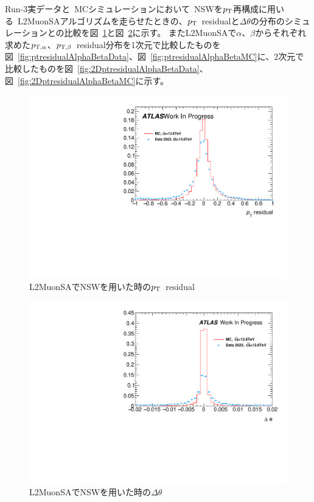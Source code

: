 Run-3実データと~MCシミュレーションにおいて~NSWを$p_\mathrm{T}$再構成に用いる~L2MuonSAアルゴリズムを走らせたときの、$p_\mathrm{T}$~residualと$\Delta\theta$の分布のシミュレーションとの比較を図~\ref{fig:ptresidualDataMC}と図~\ref{fig:deltaThetaDataMC}に示す。
またL2MuonSAで$\alpha$、$\beta$からそれぞれ求めた$p_{\rm{T, \alpha}}$、$p_{\rm{T, \beta}}$~residual分布を1次元で比較したものを図~\ref{fig:ptresidualAlphaBetaData}、図~\ref{fig:ptresidualAlphaBetaMC}に、2次元で比較したものを図~\ref{fig:2DptresidualAlphaBetaData}、図~\ref{fig:2DptresidualAlphaBetaMC}に示す。
\begin{figure}[h]
    \centering
    \includegraphics[clip, width=12cm]{fig/5/ptresidual_NSW.pdf}
    \caption{L2MuonSAでNSWを用いた時の$p_\mathrm{T}$~residual}
    \label{fig:ptresidualDataMC}
\end{figure}

\begin{figure}[h]
    \centering
    \includegraphics[clip, width=12cm]{fig/5/deltaTheta_NSW.pdf}
    \caption{L2MuonSAでNSWを用いた時の$\Delta \theta$}
    \label{fig:deltaThetaDataMC}
\end{figure}

